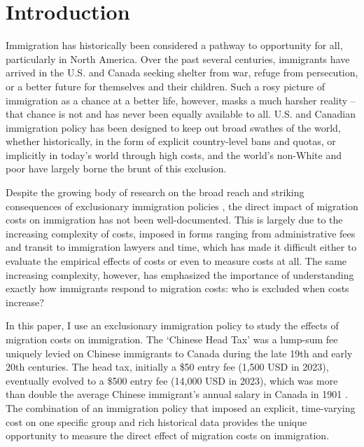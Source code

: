 \section{Introduction}

Immigration has historically been considered a pathway to opportunity for all, particularly in North America. Over the past several centuries, immigrants have arrived in the U.S. and Canada seeking shelter from war, refuge from persecution, or a better future for themselves and their children. Such a rosy picture of immigration as a chance at a better life, however, masks a much harsher reality -- that chance is not and has never been equally available to all. U.S. and Canadian immigration policy has been designed to keep out broad swathes of the world, whether historically, in the form of explicit country-level bans and quotas, or implicitly in today's world through high costs, and the world's non-White and poor have largely borne the brunt of this exclusion.

Despite the growing body of research on the broad reach and striking consequences of exclusionary immigration policies \citep{clemensetal2018,ChenXie2020,feigenberg2020,Abramitzkyetal2023}, the direct impact of migration costs on immigration has not been well-documented. This is largely due to the increasing complexity of costs, imposed in forms ranging from administrative fees and transit to immigration lawyers and time, which has made it difficult either to evaluate the empirical effects of costs or even to measure costs at all. The same increasing complexity, however, has emphasized the importance of understanding exactly how immigrants respond to migration costs: who is excluded when costs increase?


In this paper, I use an exclusionary immigration policy to study the effects of migration costs on immigration. The `Chinese Head Tax' was a lump-sum fee uniquely levied on Chinese immigrants to Canada during the late 19th and early 20th centuries. The head tax, initially a \$50 entry fee (1,500 USD in 2023), eventually evolved to a \$500 entry fee (14,000 USD in 2023), which was more than double the average Chinese immigrant's annual salary in Canada in 1901 \citep{census1901}. The combination of an immigration policy that imposed an explicit, time-varying cost on one specific group and rich historical data provides the unique opportunity to measure the direct effect of migration costs on immigration. 

